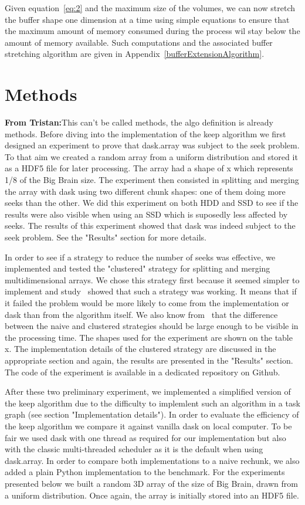 \documentclass[conference]{IEEEtran}
\newcommand{\tristan}[1]{\color{orange}\textbf{From Tristan:}#1\color{black}}
\begin{document}
Given equation~\ref{eq:2} and the maximum size of the volumes, we can now
stretch the buffer shape one dimension at a time using simple equations to ensure
that the maximum amount of memory consumed during the process wil stay below the
amount of memory available. Such computations and the associated buffer stretching
algorithm are given in Appendix~\ref{bufferExtensionAlgorithm}.

\section{Methods}
\tristan{This can't be called methods, the algo definition is already methods.}
Before diving into the implementation of the keep algorithm we first designed
an experiment to prove that dask.array was subject to the seek problem. To that
aim we created a random array from a uniform distribution and stored it as a
HDF5 file for later processing. The array had a shape of x which represents 1/8
of the Big Brain size. The experiment then consisted in splitting and merging
the array with dask using two different chunk shapes: one of them doing more
seeks than the other. We did this experiment on both HDD and SSD to see if the
results were also visible when using an SSD which is suposedly less affected by
seeks. The results of this experiment showed that dask was indeed subject to the
seek problem. See the "Results" section for more details.

In order to see if a strategy to reduce the number of seeks was effective, we
implemented and tested the "clustered" strategy for splitting and merging
multidimensional arrays. We chose this strategy first because it seemed simpler
to implement and study~\cite{seqalgorithms} showed that such a strategy was
working. It means that if it failed the problem would be more likely to come
from the implementation or dask than from the algorithm itself. We also know
from~\cite{seqalgorithms} that the difference between the naive and clustered
strategies should be large enough to be visible in the processing time. The
shapes used for the experiment are shown on the table x. The implementation
details of the clustered strategy are discussed in the appropriate section and
again, the results are presented in the "Results" section. The code of the
experiment is available in a dedicated repository on Github.

After these two preliminary experiment, we implemented a simplified version of
the keep algorithm due to the difficulty to implemlent such an algorithm in a
task graph (see section "Implementation details"). In order to evaluate the
efficiency of the keep algorithm we compare it against vanilla dask on local
computer. To be fair we used dask with one thread as required for our
implementation but also with the classic multi-threaded  scheduler as it is the
default when using dask.array. In order to compare both implementations to a
naive rechunk, we also added a plain Python implementation to the benchmark. For
the experiments presented below we built a random 3D array of the size of Big
Brain, drawn from a uniform distribution. Once again, the array is initially
stored into an HDF5 file.
\end{document}
